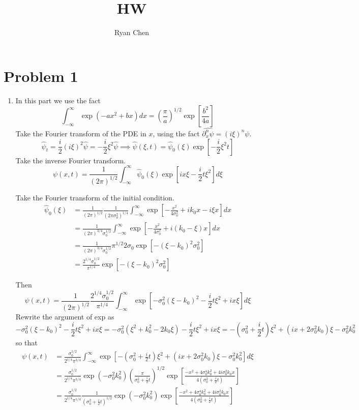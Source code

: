 \documentclass{article}
\title{HW}
\author{Ryan Chen}
\newcommand{\br}[1]{\left(#1\right)}
\newcommand{\imp}{\implies}
\newcommand{\ptl}{\partial}
\begin{document}
	
\maketitle

\section*{Problem 1}

\begin{enumerate}[label=(\alph*)]
	
\item In this part we use the fact
$$\int_{-\infty}^{\infty}\exp(-ax^2+bx)dx = \br{\frac\pi a}^{1/2}\exp[\frac{b^2}{4a}]$$
Take the Fourier transform of the PDE in $x$, using the fact $\hat{\ptl_x^n\psi}=(i\xi)^n\psi$.
$$\hat\psi_t = \frac i2(i\xi)^2\hat\psi = -\frac i2\xi^2\hat\psi
\imp \hat\psi(\xi,t) = \hat\psi_0(\xi)\exp[-\frac i2\xi^2t]$$
Take the inverse Fourier transform.
$$\psi(x,t) = \frac{1}{(2\pi)^{1/2}}\int_{-\infty}^{\infty} \hat\psi_0(\xi)\exp[ix\xi - \frac i2t\xi^2]d\xi$$

Take the Fourier transform of the initial condition.
\begin{align*}
	\hat\psi_0(\xi) &= \frac{1}{(2\pi)^{1/2}}\frac{1}{(2\pi \sigma_0^2)^{1/4}}\int_{-\infty}^{\infty} \exp[-\frac{x^2}{4\sigma_0^2} + ik_0x - i\xi x]dx\\
	&= \frac{1}{(2\pi)^{3/4}\sigma_0^{1/2}}\int_{-\infty}^{\infty} \exp[-\frac{x^2}{4\sigma_0^2} + i(k_0-\xi)x]dx\\
	&= \frac{1}{(2\pi)^{3/4}\sigma_0^{1/2}}\pi^{1/2}2\sigma_0\exp[-(\xi-k_0)^2\sigma_0^2]\\
	&= \frac{2^{1/4}\sigma_0^{1/2}}{\pi^{1/4}}\exp[-(\xi-k_0)^2\sigma_0^2]
\end{align*}

Then
$$\psi(x,t) = \frac{1}{(2\pi)^{1/2}}\frac{2^{1/4}\sigma_0^{1/2}}{\pi^{1/4}}\int_{-\infty}^{\infty}\exp[-\sigma_0^2(\xi-k_0)^2 - \frac i2t\xi^2 + ix\xi]d\xi$$
Rewrite the argument of exp as
$$-\sigma_0^2(\xi-k_0)^2 - \frac i2t\xi^2 + ix\xi
= -\sigma_0^2(\xi^2+k_0^2-2k_0\xi) - \frac i2t\xi^2 + ix\xi
= -\br{\sigma_0^2 + \frac i2t}\xi^2 + (ix + 2\sigma_0^2k_0)\xi - \sigma_0^2k_0^2$$
so that
\begin{align*}
	\psi(x,t) &= \frac{\sigma_0^{1/2}}{2^{1/4}\pi^{3/4}}\int^{\infty}_{-\infty}\exp[-\br{\sigma_0^2 + \frac i2t}\xi^2 + (ix + 2\sigma_0^2k_0)\xi - \sigma_0^2k_0^2]d\xi\\
	&= \frac{\sigma_0^{1/2}}{2^{1/4}\pi^{3/4}}\exp(-\sigma_0^2k_0^2)\br{\frac{\pi}{\sigma_0^2+\frac i2t}}^{1/2}\exp[\frac{-x^2 + 4\sigma_0^4k_0^2 + 4i\sigma_0^2k_0x}{4\br{\sigma_0^2 + \frac i2t}}]\\
	&= \frac{\sigma_0^{1/2}}{2^{1/4}\pi^{1/4}}\frac{1}{(\sigma_0^2+\frac i2t)^{1/2}}\exp(-\sigma_0^2k_0^2)\exp[\frac{-x^2 + 4\sigma_0^4k_0^2 + 4i\sigma_0^2k_0x}{4\br{\sigma_0^2 + \frac i2t}}]
\end{align*}


\end{enumerate}
\end{document}
